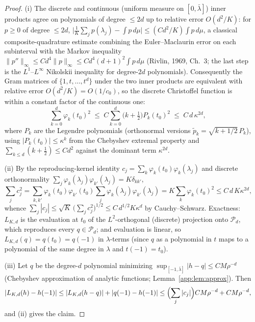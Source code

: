 \begin{proof}
(i) The discrete and continuous (uniform measure on $[0,\bar\lambda]$)
inner products agree on polynomials of degree $\le 2d$ up to relative
error $O(d^2/K)$: for $p\ge0$ of degree $\le 2d$,
$\bigl|\frac1K\sum_jp(\lambda_j)-\int p\,d\mu\bigr|
\le (C d^2/K)\int p\,d\mu$,
a classical composite-quadrature estimate combining the
Euler--Maclaurin error on each subinterval with the Markov inequality
$\|p''\|_\infty\le C d^4\|p\|_\infty\le C d^4(d+1)^2\int p\,d\mu$
(Rivlin, 1969, Ch.~3; the last step is the $L^1$--$L^\infty$ Nikolskii
inequality for degree-$2d$ polynomials). Consequently the Gram matrices
of $\{1,t,\dots,t^d\}$ under the two inner products are equivalent with
relative error $O(d^2/K)=O(1/c_0)$, so the discrete Christoffel function
is within a constant factor of the continuous one:
\[
  \sum_{k=0}^{d}\varphi_k(t_0)^2
  \;\le\;C\sum_{k=0}^{d}\bigl(k+\tfrac12\bigr)P_k(t_0)^2
  \;\le\;C\,d\,\kappa^{2d},
\]
where $P_k$ are the Legendre polynomials (orthonormal versions
$\tilde p_k=\sqrt{k+1/2}\,P_k$), using $|P_k(t_0)|\le\kappa^k$ from the
Chebyshev extremal property and $\sum_{k\le d}(k+\tfrac12)\le C d^2$
against the dominant term $\kappa^{2d}$.

(ii) By the reproducing-kernel identity
$c_j=\sum_k\varphi_k(t_0)\varphi_k(\lambda_j)$ and discrete
orthonormality $\sum_j\varphi_k(\lambda_j)\varphi_{k'}(\lambda_j)
=K\delta_{kk'}$,
\[
  \sum_jc_j^2
  =\sum_{k,k'}\varphi_k(t_0)\varphi_{k'}(t_0)
   \textstyle\sum_j\varphi_k(\lambda_j)\varphi_{k'}(\lambda_j)
  =K\sum_k\varphi_k(t_0)^2
  \le C\,d\,K\kappa^{2d},
\]
whence $\sum_j|c_j|\le\sqrt K\,\bigl(\sum_jc_j^2\bigr)^{1/2}
\le C\,d^{1/2}K\kappa^{d}$ by Cauchy--Schwarz. Exactness: $L_{K,d}$ is
the evaluation at $t_0$ of the $L^2$-orthogonal (discrete) projection
onto $\mathcal P_d$, which reproduces every $q\in\mathcal P_d$; and
evaluation is linear, so $L_{K,d}(q)=q(t_0)=q(-1)$ in $\lambda$-terms
(since $q$ as a polynomial in $t$ maps to a polynomial of the same degree
in $\lambda$ and $t(-1)=t_0$).

(iii) Let $q$ be the degree-$d$ polynomial minimizing
$\sup_{[-1,\bar\lambda]}|h-q|\le CM\rho^{-d}$ (Chebyshev approximation of
analytic functions; Lemma~\ref{app:lem:approx}). Then
\[
  |L_{K,d}(h)-h(-1)|
  \le|L_{K,d}(h-q)|+|q(-1)-h(-1)|
  \le\Bigl(\sum_j|c_j|\Bigr)CM\rho^{-d}+CM\rho^{-d},
\]
and (ii) gives the claim.
\end{proof}

